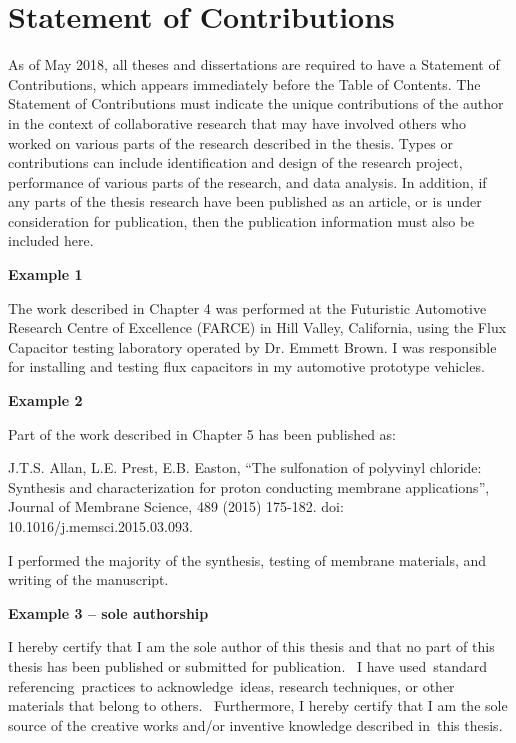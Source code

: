 \chapter*{Statement of Contributions}


As of May 2018, all theses and dissertations are required to have a Statement of Contributions, which appears immediately before the Table of Contents. The Statement of Contributions must indicate the unique contributions of the author in the context of collaborative research that may have involved others who worked on various parts of the research described in the thesis. Types or contributions can include identification and design of the research project, performance of various parts of the research, and data analysis. In addition, if any parts of the thesis research have been published as an article, or is under consideration for publication, then the publication information must also be included here. 

\textbf{Example 1}

The work described in Chapter 4 was performed at the Futuristic Automotive Research Centre of Excellence (FARCE) in Hill Valley, California, using the Flux Capacitor testing laboratory operated by Dr. Emmett Brown. I was responsible for installing and testing flux capacitors in my automotive prototype vehicles.

\textbf{Example 2}

Part of the work described in Chapter 5 has been published as:

J.T.S. Allan, L.E. Prest, E.B. Easton, “The sulfonation of polyvinyl chloride: Synthesis and characterization for proton conducting membrane applications”, Journal of Membrane Science, 489 (2015) 175-182. doi: 10.1016/j.memsci.2015.03.093. 

I performed the majority of the synthesis, testing of membrane materials, and writing of the manuscript. 

\textbf{Example 3 – sole authorship}

I hereby certify that I am the sole author of this thesis and that no part of this thesis has been published or submitted for publication.  I have used standard referencing practices to acknowledge ideas, research techniques, or other materials that belong to others.  Furthermore, I hereby certify that I am the sole source of the creative works and/or inventive knowledge described in this thesis.